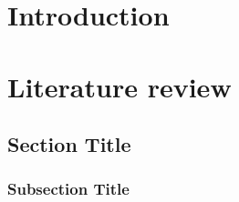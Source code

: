 \documentclass[master]{NTHUthesis}
\begin{document}
\makecover


\begin{abstractEN}
\lipsum[1-2]
\end{abstractEN}

\begin{abstractSED}
\lipsum[1-2]
\end{abstractSED}

\begin{abstractZH}
\zhlipsum[1-2]
\end{abstractZH}

\begin{acknowledgementsEN}
\lipsum[1-2]
\end{acknowledgementsEN}

\maketoc

\listofalgorithms
{}
\clearpage



\chapter{Introduction}
\lipsum[1-3]

\chapter{Literature review}
\lipsum[1-3]

\section{Section Title}
\lipsum[4-5]

\subsection{Subsection Title}
\lipsum[6]






\newpage
{}
\printbibliography[title={References}]
\end{document}
